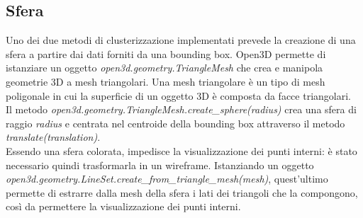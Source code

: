 \documentclass[italian]{report}
\begin{document}
\subsection{Sfera}
Uno dei due metodi di clusterizzazione implementati prevede la creazione di una sfera a partire dai dati forniti da una bounding box. Open3D permette di istanziare un oggetto \textit{open3d.geometry.TriangleMesh} che crea e manipola geometrie 3D a mesh triangolari. Una mesh triangolare è un tipo di mesh poligonale in cui la superficie di un oggetto 3D è composta da facce triangolari.\\
Il metodo \textit{open3d.geometry.TriangleMesh.create\_sphere(radius)} crea una sfera di raggio \textit{radius} e centrata nel centroide della bounding box attraverso il metodo \textit{translate(translation)}.\\
Essendo una sfera colorata, impedisce la visualizzazione dei punti interni: è stato necessario quindi trasformarla in un wireframe. Istanziando un oggetto\\ \textit{open3d.geometry.LineSet.create\_from\_triangle\_mesh(mesh)}, quest'ultimo permette di estrarre dalla mesh della sfera i lati dei triangoli che la compongono, così da permettere la visualizzazione dei punti interni.\\
\end{document}
